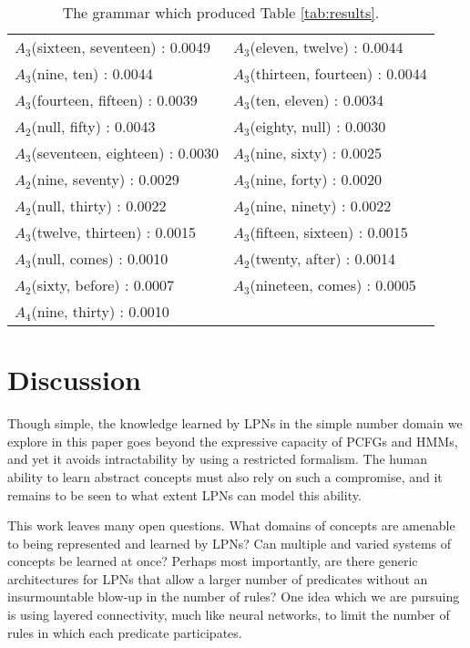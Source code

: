 \documentclass[10pt, twocolumn]{article}
\begin{document}
\begin{table}[t]
\begin{tabular}{>{\tiny} l >{\tiny} l}
$A_3$(sixteen, seventeen) : 0.0049 &
$A_3$(eleven, twelve) : 0.0044 \\
$A_3$(nine, ten) : 0.0044 &
$A_3$(thirteen, fourteen) : 0.0044 \\
$A_3$(fourteen, fifteen) : 0.0039 &
$A_3$(ten, eleven) : 0.0034 \\
$A_2$(null, fifty) : 0.0043 &
$A_3$(eighty, null) : 0.0030 \\
$A_3$(seventeen, eighteen) : 0.0030 &
$A_3$(nine, sixty) : 0.0025 \\
$A_2$(nine, seventy) : 0.0029 &
$A_3$(nine, forty) : 0.0020 \\
$A_2$(null, thirty) : 0.0022 &
$A_2$(nine, ninety) : 0.0022 \\
$A_3$(twelve, thirteen) : 0.0015 &
$A_3$(fifteen, sixteen) : 0.0015 \\
$A_3$(null, comes) : 0.0010 &
$A_2$(twenty, after) : 0.0014 \\
$A_2$(sixty, before) : 0.0007 &
$A_3$(nineteen, comes) : 0.0005 \\
$A_4$(nine, thirty) : 0.0010 & \\
\end{tabular}
\caption{The grammar which produced Table \ref{tab:results}.}
\label{tab:grammar}
\end{table}

\section{Discussion}

Though simple, the knowledge learned by LPNs in the simple number
domain we explore in this paper goes beyond the expressive capacity of
PCFGs and HMMs, and yet it avoids intractability by using a restricted
formalism. The human ability to learn abstract concepts must also rely
on such a compromise, and it remains to be seen to what extent LPNs
can model this ability.

This work leaves many open questions. What domains of concepts are
amenable to being represented and learned by LPNs? Can multiple and
varied systems of concepts be learned at once? Perhaps most
importantly, are there generic architectures for LPNs that allow a
larger number of predicates without an insurmountable blow-up in the
number of rules? One idea which we are pursuing is using layered
connectivity, much like neural networks, to limit the number of rules
in which each predicate participates. 
\end{document}
